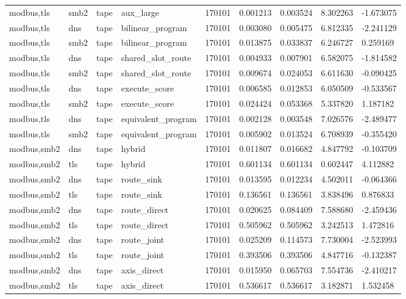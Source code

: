 \begin{tabular}{lllllllll}
modbus,tls & smb2 & tape & aux\_large & 170101 & 0.001213 & 0.003524 & 8.302263 & -1.673075 \\
modbus,tls & dns & tape & bilinear\_program & 170101 & 0.003080 & 0.005475 & 6.812335 & -2.241129 \\
modbus,tls & smb2 & tape & bilinear\_program & 170101 & 0.013875 & 0.033837 & 6.246727 & 0.259169 \\
modbus,tls & dns & tape & shared\_slot\_route & 170101 & 0.004933 & 0.007901 & 6.582075 & -1.814582 \\
modbus,tls & smb2 & tape & shared\_slot\_route & 170101 & 0.009674 & 0.024053 & 6.611630 & -0.090425 \\
modbus,tls & dns & tape & execute\_score & 170101 & 0.006585 & 0.012853 & 6.050509 & -0.533567 \\
modbus,tls & smb2 & tape & execute\_score & 170101 & 0.024424 & 0.053368 & 5.337820 & 1.187182 \\
modbus,tls & dns & tape & equivalent\_program & 170101 & 0.002128 & 0.003548 & 7.026576 & -2.489477 \\
modbus,tls & smb2 & tape & equivalent\_program & 170101 & 0.005902 & 0.013524 & 6.708939 & -0.355420 \\
modbus,smb2 & dns & tape & hybrid & 170101 & 0.011807 & 0.016682 & 4.847792 & -0.103709 \\
modbus,smb2 & tls & tape & hybrid & 170101 & 0.601134 & 0.601134 & 0.602447 & 4.112882 \\
modbus,smb2 & dns & tape & route\_sink & 170101 & 0.013595 & 0.012234 & 4.502011 & -0.064366 \\
modbus,smb2 & tls & tape & route\_sink & 170101 & 0.136561 & 0.136561 & 3.838496 & 0.876833 \\
modbus,smb2 & dns & tape & route\_direct & 170101 & 0.020625 & 0.084409 & 7.588680 & -2.459436 \\
modbus,smb2 & tls & tape & route\_direct & 170101 & 0.505962 & 0.505962 & 3.242513 & 1.472816 \\
modbus,smb2 & dns & tape & route\_joint & 170101 & 0.025209 & 0.114573 & 7.730004 & -2.523993 \\
modbus,smb2 & tls & tape & route\_joint & 170101 & 0.393506 & 0.393506 & 4.847716 & -0.132387 \\
modbus,smb2 & dns & tape & axis\_direct & 170101 & 0.015950 & 0.065703 & 7.554736 & -2.410217 \\
modbus,smb2 & tls & tape & axis\_direct & 170101 & 0.536617 & 0.536617 & 3.182871 & 1.532458 \\

\end{tabular}

